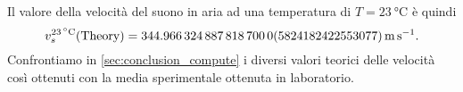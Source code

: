 \documentclass[
    rmp,
    reprint, 
    superscriptaddress, 
    altaffilletter, 
    amsmath, 
    amssymb, 
    a4paper,
    varvw]{revtex4-2}
\begin{document}
Il valore della velocità del suono in aria ad una temperatura di $T=\SI{23}{\celsius}$ è quindi \[v_s^{\SI{23}{\celsius}}(\text{Theory})=\SI{344.9663248878187 +- 0.5824182422553077}{\metre\per\second}.\] Confrontiamo in \ref{sec:conclusion_compute} i diversi valori teorici delle velocità così ottenuti con la media sperimentale ottenuta in laboratorio. 

\setcounter{table}{0}
\renewcommand{\thetable}{A-\Roman{table}}
\end{document}

